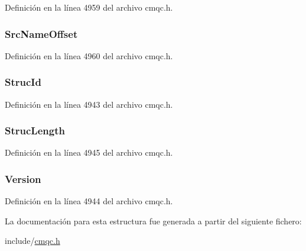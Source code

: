 Definición en la línea 4959 del archivo cmqc.\+h.

\hypertarget{structtag_m_q_r_m_h_a253af24d5627cf285175bdaad83f1995}{}
\subsubsection[{Src\+Name\+Offset}]{ Src\+Name\+Offset}\label{structtag_m_q_r_m_h_a253af24d5627cf285175bdaad83f1995}


Definición en la línea 4960 del archivo cmqc.\+h.

\hypertarget{structtag_m_q_r_m_h_a0530922ca944569b52601d74941f96e4}{}
\subsubsection[{Struc\+Id}]{ Struc\+Id}\label{structtag_m_q_r_m_h_a0530922ca944569b52601d74941f96e4}


Definición en la línea 4943 del archivo cmqc.\+h.

\hypertarget{structtag_m_q_r_m_h_a830af9a4a08c015b9a4b2d39d4d3420a}{}
\subsubsection[{Struc\+Length}]{ Struc\+Length}\label{structtag_m_q_r_m_h_a830af9a4a08c015b9a4b2d39d4d3420a}


Definición en la línea 4945 del archivo cmqc.\+h.

\hypertarget{structtag_m_q_r_m_h_a0656ef8f766b3907d394d88a35d7b7e9}{}
\subsubsection[{Version}]{ Version}\label{structtag_m_q_r_m_h_a0656ef8f766b3907d394d88a35d7b7e9}


Definición en la línea 4944 del archivo cmqc.\+h.



La documentación para esta estructura fue generada a partir del siguiente fichero\+:\begin{DoxyCompactItemize}
\item 
include/\hyperlink{cmqc_8h}{cmqc.\+h}\end{DoxyCompactItemize}
